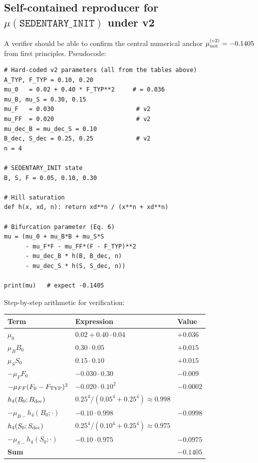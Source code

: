 \documentclass[11pt,a4paper]{article}
\theoremstyle{definition}
\begin{document}
\subsection{Self-contained reproducer for $\mu(\texttt{SEDENTARY\_INIT})$ under v2}

A verifier should be able to confirm the central numerical anchor $\mu_{\rm init}^{(v2)} = -0.1405$ from first principles. Pseudocode:

\begin{lstlisting}
# Hard-coded v2 parameters (all from the tables above)
A_TYP, F_TYP = 0.10, 0.20
mu_0   = 0.02 + 0.40 * F_TYP**2     # = 0.036
mu_B, mu_S = 0.30, 0.15
mu_F   = 0.030                       # v2
mu_FF  = 0.020                       # v2
mu_dec_B = mu_dec_S = 0.10
B_dec, S_dec = 0.25, 0.25            # v2
n = 4

# SEDENTARY_INIT state
B, S, F = 0.05, 0.10, 0.30

# Hill saturation
def h(x, xd, n): return xd**n / (x**n + xd**n)

# Bifurcation parameter (Eq. 6)
mu = (mu_0 + mu_B*B + mu_S*S
      - mu_F*F - mu_FF*(F - F_TYP)**2
      - mu_dec_B * h(B, B_dec, n)
      - mu_dec_S * h(S, S_dec, n))

print(mu)   # expect -0.1405
\end{lstlisting}

Step-by-step arithmetic for verification:
\begin{center}\small
\begin{tabular}{lll}
\toprule
Term & Expression & Value \\
\midrule
$\mu_0$                    & $0.02 + 0.40 \cdot 0.04$                  & $+0.036$ \\
$\mu_B B_0$                & $0.30 \cdot 0.05$                          & $+0.015$ \\
$\mu_S S_0$                & $0.15 \cdot 0.10$                          & $+0.015$ \\
$-\mu_F F_0$               & $-0.030 \cdot 0.30$                        & $-0.009$ \\
$-\mu_{FF}(F_0 - F_{\rm TYP})^2$ & $-0.020 \cdot 0.10^2$                & $-0.0002$ \\
$h_4(B_0; B_{\rm dec})$    & $0.25^4 / (0.05^4 + 0.25^4) \approx 0.998$ & \\
$-\mu_{B-} h_4(B_0; \cdot)$ & $-0.10 \cdot 0.998$                       & $-0.0998$ \\
$h_4(S_0; S_{\rm dec})$    & $0.25^4 / (0.10^4 + 0.25^4) \approx 0.975$ & \\
$-\mu_{S-} h_4(S_0; \cdot)$ & $-0.10 \cdot 0.975$                       & $-0.0975$ \\
\midrule
\textbf{Sum} & & $\boldsymbol{-0.1405}$ \\
\bottomrule
\end{tabular}
\end{center}
\end{document}
